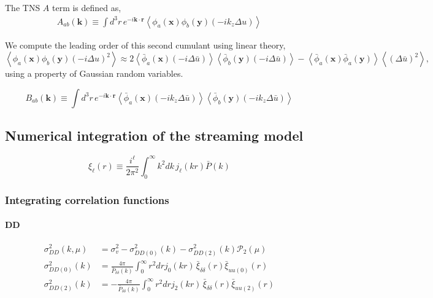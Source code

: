 \documentclass[a4paper,11pt, fleqn]{article}
\begin{document}
The TNS $A$ term is defined as,
\begin{align}
  A_{ab}(\bm{k}) \equiv
  \int\!d^3 r \, e^{-i\bm{k}\cdot\bm{r}} \left\langle
  \phi_a(\bm{x}) \phi_b(\bm{y}) (-i k_z \Delta u) \right\rangle
\end{align}


We compute the leading order of this second cumulant using linear
theory,
\begin{equation}
  \left\langle
  \phi_a(\bm{x}) \phi_b(\bm{y}) (-i \Delta u)^2 \right\rangle
  \approx
  2 \left\langle \bar{\phi}_a(\bm{x})
                  (-i\Delta \bar{u}) \right\rangle
    \left\langle \bar{\phi}_b(\bm{y})
                  (-i\Delta \bar{u}) \right\rangle
  - \left\langle \bar{\phi}_a(\bm{x})
                 \bar{\phi}_a(\bm{y}) \right\rangle
  \left\langle (\Delta \bar{u})^2 \right\rangle,
\end{equation}
using a property of Gaussian random variables.


\begin{equation}
  B_{ab}(\bm{k}) \equiv
  \int\!d^3 r \, e^{-i\bm{k}\cdot\bm{r}}
  \left\langle \bar{\phi}_a(\bm{x})
                  (-ik_z \Delta \bar{u}) \right\rangle
  \left\langle \bar{\phi}_b(\bm{y})
                  (-ik_z \Delta \bar{u}) \right\rangle
\end{equation}

%
%
\clearpage
\subsection{Numerical integration of the streaming model}

\begin{equation}
  \xi_\ell(r) \equiv \frac{i^\ell}{2\pi^2}
  \int_0^\infty \! k^2 dk \, j_\ell(kr) \bar{P}(k)
\end{equation}

\subsubsection{Integrating correlation functions}

%
%
\paragraph{DD}

\begin{align}
  \sigma^2_{DD}(k, \mu) &=
  \sigma_v^2 - \sigma^2_{DD(0)}(k)
             - \sigma^2_{DD(2)}(k) \mathcal{P}_2(\mu)\\
%
  \sigma^2_{DD(0)}(k) &= 
  \frac{4\pi}{\bar{P}_{\delta\delta}(k)} \int_0^\infty \! r^2 dr
  j_0(kr)\,
  \bar{\xi}_{\delta\delta}(r)
  \bar{\xi}_{uu(0)}(r)\\
%
  \sigma^2_{DD(2)}(k) &=
  - \frac{4\pi}{\bar{P}_{\delta\delta}(k)} \int_0^\infty \! r^2 dr
  j_2(kr) \,\bar{\xi}_{\delta\delta}(r) \bar{\xi}_{uu(2)}(r)
\end{align}
\end{document}
